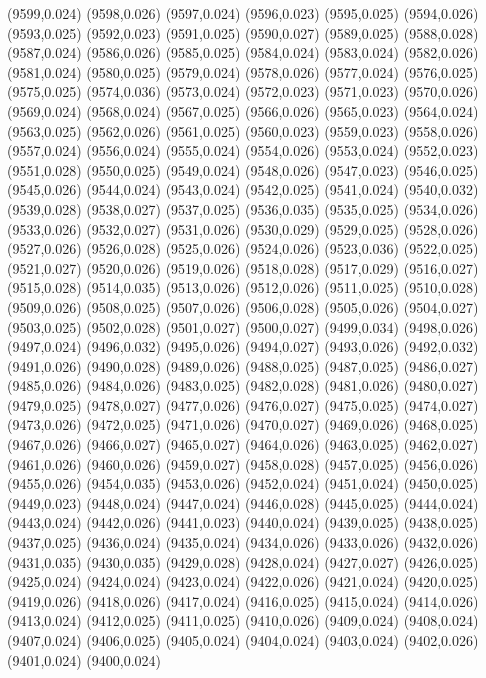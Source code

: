 (9599,0.024)
(9598,0.026)
(9597,0.024)
(9596,0.023)
(9595,0.025)
(9594,0.026)
(9593,0.025)
(9592,0.023)
(9591,0.025)
(9590,0.027)
(9589,0.025)
(9588,0.028)
(9587,0.024)
(9586,0.026)
(9585,0.025)
(9584,0.024)
(9583,0.024)
(9582,0.026)
(9581,0.024)
(9580,0.025)
(9579,0.024)
(9578,0.026)
(9577,0.024)
(9576,0.025)
(9575,0.025)
(9574,0.036)
(9573,0.024)
(9572,0.023)
(9571,0.023)
(9570,0.026)
(9569,0.024)
(9568,0.024)
(9567,0.025)
(9566,0.026)
(9565,0.023)
(9564,0.024)
(9563,0.025)
(9562,0.026)
(9561,0.025)
(9560,0.023)
(9559,0.023)
(9558,0.026)
(9557,0.024)
(9556,0.024)
(9555,0.024)
(9554,0.026)
(9553,0.024)
(9552,0.023)
(9551,0.028)
(9550,0.025)
(9549,0.024)
(9548,0.026)
(9547,0.023)
(9546,0.025)
(9545,0.026)
(9544,0.024)
(9543,0.024)
(9542,0.025)
(9541,0.024)
(9540,0.032)
(9539,0.028)
(9538,0.027)
(9537,0.025)
(9536,0.035)
(9535,0.025)
(9534,0.026)
(9533,0.026)
(9532,0.027)
(9531,0.026)
(9530,0.029)
(9529,0.025)
(9528,0.026)
(9527,0.026)
(9526,0.028)
(9525,0.026)
(9524,0.026)
(9523,0.036)
(9522,0.025)
(9521,0.027)
(9520,0.026)
(9519,0.026)
(9518,0.028)
(9517,0.029)
(9516,0.027)
(9515,0.028)
(9514,0.035)
(9513,0.026)
(9512,0.026)
(9511,0.025)
(9510,0.028)
(9509,0.026)
(9508,0.025)
(9507,0.026)
(9506,0.028)
(9505,0.026)
(9504,0.027)
(9503,0.025)
(9502,0.028)
(9501,0.027)
(9500,0.027)
(9499,0.034)
(9498,0.026)
(9497,0.024)
(9496,0.032)
(9495,0.026)
(9494,0.027)
(9493,0.026)
(9492,0.032)
(9491,0.026)
(9490,0.028)
(9489,0.026)
(9488,0.025)
(9487,0.025)
(9486,0.027)
(9485,0.026)
(9484,0.026)
(9483,0.025)
(9482,0.028)
(9481,0.026)
(9480,0.027)
(9479,0.025)
(9478,0.027)
(9477,0.026)
(9476,0.027)
(9475,0.025)
(9474,0.027)
(9473,0.026)
(9472,0.025)
(9471,0.026)
(9470,0.027)
(9469,0.026)
(9468,0.025)
(9467,0.026)
(9466,0.027)
(9465,0.027)
(9464,0.026)
(9463,0.025)
(9462,0.027)
(9461,0.026)
(9460,0.026)
(9459,0.027)
(9458,0.028)
(9457,0.025)
(9456,0.026)
(9455,0.026)
(9454,0.035)
(9453,0.026)
(9452,0.024)
(9451,0.024)
(9450,0.025)
(9449,0.023)
(9448,0.024)
(9447,0.024)
(9446,0.028)
(9445,0.025)
(9444,0.024)
(9443,0.024)
(9442,0.026)
(9441,0.023)
(9440,0.024)
(9439,0.025)
(9438,0.025)
(9437,0.025)
(9436,0.024)
(9435,0.024)
(9434,0.026)
(9433,0.026)
(9432,0.026)
(9431,0.035)
(9430,0.035)
(9429,0.028)
(9428,0.024)
(9427,0.027)
(9426,0.025)
(9425,0.024)
(9424,0.024)
(9423,0.024)
(9422,0.026)
(9421,0.024)
(9420,0.025)
(9419,0.026)
(9418,0.026)
(9417,0.024)
(9416,0.025)
(9415,0.024)
(9414,0.026)
(9413,0.024)
(9412,0.025)
(9411,0.025)
(9410,0.026)
(9409,0.024)
(9408,0.024)
(9407,0.024)
(9406,0.025)
(9405,0.024)
(9404,0.024)
(9403,0.024)
(9402,0.026)
(9401,0.024)
(9400,0.024)
